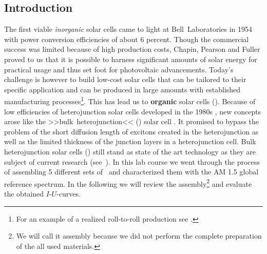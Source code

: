 \documentclass[a4paper,10pt,twocolumn]{article}
\begin{document}
\begin{extract*}
	
\section*{Introduction}%

The first viable \textit{inorganic} solar cells came to light at Bell~Laboratories in 1954 \cite{siliconSC_1}\cite{siliconSC_2} with power conversion efficiencies of about 6 percent. Though the commercial success was limited because of high production costs, Chapin, Pearson and Fuller proved to us that it is possible to harness significant amounts of solar energy for practical usage and thus set foot for photovoltaic advancements.\mypar
Today's challenge is however to build low-cost solar cells that can be tailored to their specific application and can be produced in large amounts with established manufacturing processes\footnote{For an example of a realized roll-to-roll production see \cite{rolltoroll}.}. This has lead us to \textbf{organic} solar cells (\OSC).\mypar
Because of low efficiencies of heterojunction solar cells developed in the 1980s \cite{tang}, new concepts arose like the >>bulk~heterojunction<< (\BHJ) solar cell \cite{heterojunk}. It promised to bypass the problem of the short diffusion length of excitons created in the heterojunction as well as the limited thickness of the junction layers in a heterojunction cell.\mypar
Bulk heterojunction solar cells (\BHSC) still stand as state of the art technology as they are subject of current research (see~\cite{modernbulkhetero}). In this lab course we went through the process of assembling 5 different sets of \BHSC\ and characterized them with the {\os\sefo AM 1.5} global reference spectrum. In the following we will review the assembly\footnote{We will call it assembly because we did not perform the complete preparation of the all used materials.} and evaluate the obtained $I$-$U$-curves.


\end{extract*}
\end{document}
